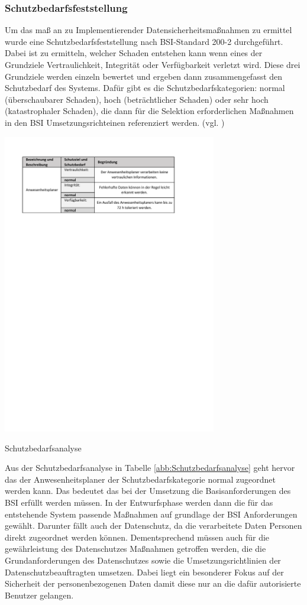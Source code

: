 \subsubsection{Schutzbedarfsfeststellung}
\label{sec:Schutzbedarfsfeststellung}
Um das maß an zu Implementierender Datensicherheitsmaßnahmen zu ermittel wurde eine Schutzbedarfsfeststellung nach BSI-Standard 200-2 durchgeführt. Dabei ist zu ermitteln, welcher Schaden entstehen kann wenn eines der Grundziele Vertraulichkeit, Integrität oder Verfügbarkeit verletzt wird. Diese drei Grundziele werden einzeln bewertet und ergeben dann zusammengefasst den Schutzbedarf des Systems. Dafür gibt es die Schutzbedarfskategorien: normal (überschaubarer Schaden), hoch (beträchtlicher Schaden) oder sehr hoch (katastrophaler Schaden), die dann für die Selektion erforderlichen Maßnahmen in den BSI Umsetzungsrichteinen referenziert werden. (vgl. \cite[S.104 - 109]{BSI200-2})

\begin{table}[htbp]
    \centering
    \includegraphics[width=0.7\textwidth,angle=0]{abb/Schutzbedarfsanalyse.pdf}
    \caption[Beschreibung]{Schutzbedarfsanalyse}
    \label{abb:Schutzbedarfsanalyse}
\end{table}

Aus der Schutzbedarfsanalyse in Tabelle \ref{abb:Schutzbedarfsanalyse} geht hervor das der Anwesenheitsplaner der Schutzbedarfskategorie normal zugeordnet werden kann. Das bedeutet das bei der Umsetzung die Basisanforderungen des BSI erfüllt werden müssen. In der Entwurfsphase werden dann die für das entstehende System passende Maßnahmen auf grundlage der BSI Anforderungen gewählt. Darunter fällt auch der Datenschutz, da die verarbeitete Daten Personen direkt zugeordnet werden können. Dementsprechend müssen auch für die gewährleistung des Datenschutzes Maßnahmen getroffen werden, die die Grundanforderungen des Datenschutzes sowie die Umsetzungsrichtlinien der Datenschutzbeauftragten umsetzen. Dabei liegt ein besonderer Fokus auf der Sicherheit der personenbezogenen Daten damit diese nur an die dafür autorisierte Benutzer gelangen.

